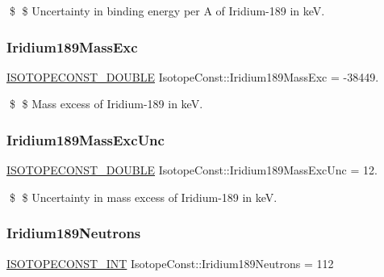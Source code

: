 \$ \$ Uncertainty in binding energy per A of Iridium-\/189 in keV. \mbox{\label{group___isotope_const-_iridium-_ir189_ga21e0533f90b2c85d75321d50cc77636b}} 
\subsubsection{\texorpdfstring{Iridium189\+Mass\+Exc}{Iridium189MassExc}}
{\footnotesize\ttfamily \mbox{\hyperlink{group___isotope_const-_macros_ga8f45a7272ce02c0b4c65c44636ed719a}{I\+S\+O\+T\+O\+P\+E\+C\+O\+N\+S\+T\+\_\+\+D\+O\+U\+B\+LE}} Isotope\+Const\+::\+Iridium189\+Mass\+Exc = -\/38449.}

\$ \$ Mass excess of Iridium-\/189 in keV. \mbox{\label{group___isotope_const-_iridium-_ir189_ga46e3764fbaf4ea71c81f1b834f9c6839}} 
\subsubsection{\texorpdfstring{Iridium189\+Mass\+Exc\+Unc}{Iridium189MassExcUnc}}
{\footnotesize\ttfamily \mbox{\hyperlink{group___isotope_const-_macros_ga8f45a7272ce02c0b4c65c44636ed719a}{I\+S\+O\+T\+O\+P\+E\+C\+O\+N\+S\+T\+\_\+\+D\+O\+U\+B\+LE}} Isotope\+Const\+::\+Iridium189\+Mass\+Exc\+Unc = 12.}

\$ \$ Uncertainty in mass excess of Iridium-\/189 in keV. \mbox{\label{group___isotope_const-_iridium-_ir189_gaf51c975ea53630a077a577e189ebe29e}} 
\subsubsection{\texorpdfstring{Iridium189\+Neutrons}{Iridium189Neutrons}}
{\footnotesize\ttfamily \mbox{\hyperlink{group___isotope_const-_macros_ga5f18360b3e99483a35c32d789e62621c}{I\+S\+O\+T\+O\+P\+E\+C\+O\+N\+S\+T\+\_\+\+I\+NT}} Isotope\+Const\+::\+Iridium189\+Neutrons = 112}

